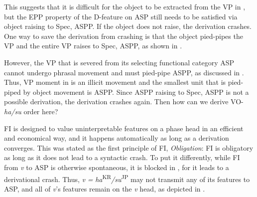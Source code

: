 \newpage
This suggests that it is difficult for the object to be extracted from the \acs{VP} in , but the \ac{EPP} property of the D-feature on \ac{ASP} still needs to be satisfied via object raising to Spec, \ac{ASP}P. If the object does not raise, the derivation crashes. One way to save the derivation from crashing is that the object pied-pipes the   \acs{VP} and the entire \acs{VP} raises to Spec, \ac{ASP}P, as shown in .

\ea\label{ex:116}
\vspace*{-10mm}
\z

\largerpage
However, the \acs{VP} that is severed from its selecting functional category \ac{ASP} cannot undergo phrasal movement and must pied-pipe \ac{ASP}P, as discussed in .  Thus, \acs{VP} moment in  is an illicit movement and the smallest unit that is pied-piped by object movement is \ac{ASP}P. Since \ac{ASP}P raising to Spec, \ac{ASP}P is not a possible derivation, the derivation crashes again. Then how can we derive \ac{VO}-\textit{ha/su} order here? 

\ac{FI} is designed to value uninterpretable features on a phase head in an efficient and economical way, and it happens automatically as long as a derivation converges. This was stated as the first principle of \ac{FI}, \textit{Obligation}: \ac{FI} is obligatory as long as it does not lead to a syntactic crash. To put it differently, while \ac{FI} from \textit{v} to \ac{ASP} is otherwise spontaneous, it is blocked in , for it leads to a derivational crash. Thus, \textit{v} \textit{=} \textit{ha}\textsuperscript{KR}\textit{/su}\textsuperscript{JP} may not transmit any of its features to \ac{ASP}, and all of \textit{v}’s features remain on the \textit{v} head, as depicted in .


